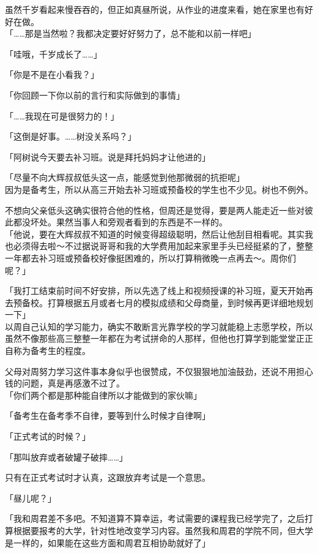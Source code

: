 虽然千岁看起来慢吞吞的，但正如真昼所说，从作业的进度来看，她在家里也有好好在做。\\

「……那是当然啦？我都决定要好好努力了，总不能和以前一样吧」

「哇哦，千岁成长了……」

「你是不是在小看我？」

「你回顾一下你以前的言行和实际做到的事情」

「……我现在可是很努力的！」

「这倒是好事。……树没关系吗？」

「阿树说今天要去补习班。说是拜托妈妈才让他进的」

「尽量不向大辉叔叔低头这一点，能感觉到他那微弱的抗拒呢」\\

因为是备考生，所以从高三开始去补习班或预备校的学生也不少见。树也不例外。

不想向父亲低头这确实很符合他的性格，但周还是觉得，要是两人能走近一些对彼此都没坏处。果然当事人和旁观者看到的东西是不一样的。\\

「他说，要在大辉叔叔不知道的时候变得超级聪明，然后让他刮目相看呢。其实我也必须得去啦～不过据说哥哥和我的大学费用加起来家里手头已经挺紧的了，整整一年都去补习班或预备校好像挺困难的，所以打算稍微晚一点再去～。周你们呢？」

「我打工结束前时间不好安排，所以先选了线上和视频授课的补习班，夏天开始再去预备校。打算根据五月或者七月的模拟成绩和父母商量，到时候再更详细地规划一下」\\

以周自己认知的学习能力，确实不敢断言光靠学校的学习就能稳上志愿学校，所以虽然不像那些高三整整一年都在为考试拼命的人那样，但他也打算学到能堂堂正正自称为备考生的程度。

父母对周努力学习这件事本身似乎也很赞成，不仅狠狠地加油鼓劲，还说不用担心钱的问题，真是再感激不过了。\\

「你们两个都是那种能自律所以才能做到的家伙嘛」

「备考生在备考季不自律，要等到什么时候才自律啊」

「正式考试的时候？」

「那叫放弃或者破罐子破摔……」

只有在正式考试时才认真，这跟放弃考试是一个意思。

「昼儿呢？」

「我和周君差不多吧。不知道算不算幸运，考试需要的课程我已经学完了，之后打算根据要报考的大学，针对性地改变学习内容。虽然我和周君的学院不同，但大学是一样的，如果能在这些方面和周君互相协助就好了」

